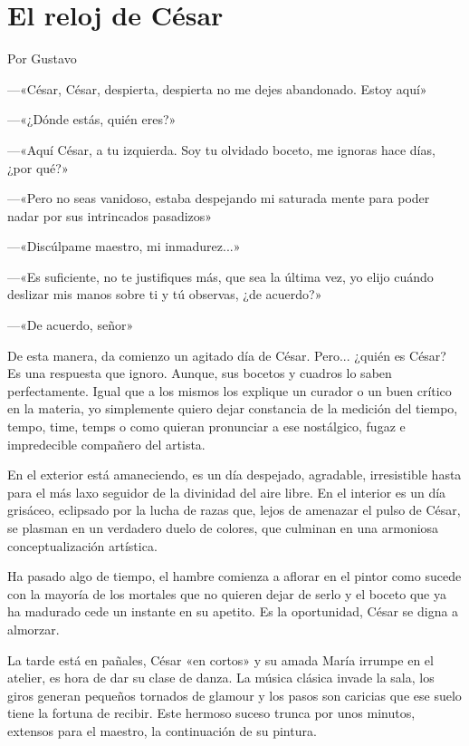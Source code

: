 \documentclass[11pt,twoside,openright,a5paper]{book}
\begin{document}
\section*{El reloj de César}

\begin{flushright}Por Gustavo\end{flushright}

---«César, César, despierta, despierta no me dejes abandonado. Estoy aquí»

---«¿Dónde estás, quién eres?»

---«Aquí César, a tu izquierda. Soy tu olvidado boceto, me ignoras hace días, ¿por qué?»

---«Pero no seas vanidoso, estaba despejando mi saturada mente para poder nadar por sus intrincados pasadizos»

---«Discúlpame maestro, mi inmadurez...»

---«Es suficiente, no te justifiques más, que sea la última vez, yo elijo cuándo deslizar mis manos sobre ti y tú observas, ¿de acuerdo?»

---«De acuerdo, señor»

De esta manera, da comienzo un agitado día de César. Pero... ¿quién es César? Es una respuesta que ignoro. Aunque, sus bocetos y cuadros lo saben perfectamente. Igual que a los mismos los explique un curador o un buen crítico en la materia, yo simplemente quiero dejar constancia de la medición del tiempo, tempo, time, temps o como quieran pronunciar a ese nostálgico, fugaz e impredecible compañero del artista.

En el exterior está amaneciendo, es un día despejado, agradable, irresistible hasta para el más laxo seguidor de la divinidad del aire libre. En el interior es un día grisáceo, eclipsado por la lucha de razas que, lejos de amenazar el pulso de César, se plasman en un verdadero duelo de colores, que culminan en una armoniosa conceptualización artística.

Ha pasado algo de tiempo, el hambre comienza a aflorar en el pintor como sucede con la mayoría de los mortales que no quieren dejar de serlo y el boceto que ya ha madurado cede un instante en su apetito. Es la oportunidad, César se digna a almorzar.

La tarde está en pañales, César «en cortos» y su amada María irrumpe en el atelier, es hora de dar su clase de danza. La música clásica invade la sala, los giros generan pequeños tornados de glamour y los pasos son caricias que ese suelo tiene la fortuna de recibir. Este hermoso suceso trunca por unos minutos, extensos para el maestro, la continuación de su pintura.
\end{document}

